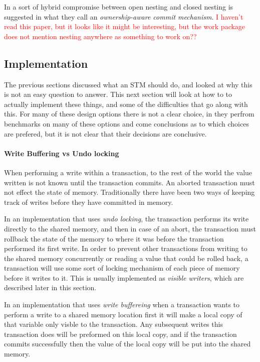 In \cite{1378553} a sort of hybrid compromise between open nesting and closed
 nesting is suggested in what they call an \emph{ownership-aware commit mechanism}.
\textcolor{Red}{I haven't read this paper, but it looks like it might
 be interesting, but the work package does not mention nesting anywhere as something to work on??}



\subsection{Implementation}
The previous sections discussed what an STM should do, and looked at why this 
is not an easy question to answer.
This next section will look at how to to actually implement these things, and some
 of the difficulties that go along with this.
For many of these design options there is not a clear choice, in \cite{1123001} they 
perfrom benchmarks on many of these options and come conclusions as to which choices are
 prefered, but it is not clear that their decisions are conclusive.

\paragraph{Write Buffering vs Undo locking}
When performing a write within a transaction, to the rest of  the world the value
 written is not known until the transaction commits.
An aborted transaction must not effect the state of memory.
Traditionally there have been two ways of keeping track of writes before they have committed in memory.

In an implementation that uses \emph{undo locking}, the transaction performs its write
 directly to the shared memory, and then in case of an abort, the transaction must
 rollback the state of the memory to where it was before the transaction performed its first write.
In order to prevent other transactions from writing to the shared memory concurrently
 or reading a value that could be rolled back, a transaction will use some sort of locking mechanism of each piece of memory before it writes to it.
This is usually implemented as \emph{visible writers}, which are described later in this section.

In an implementation that uses \emph{write buffereing} when a transaction wants to perform
 a write to a shared memory location first it will make a local copy of that variable only visble to the transaction.
Any subsequent writes this transaction does will be preformed on this local copy,
 and if the transaction commits successfully then the value of the local copy will be put into the shared memory.

